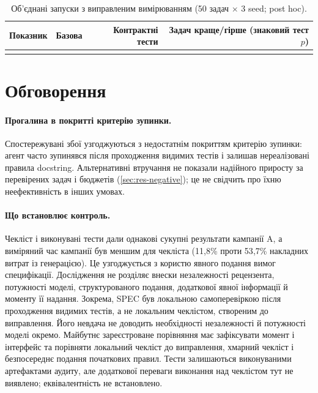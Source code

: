 \documentclass[11pt]{article}
\begin{document}
\begin{table}[tb]
\centering\small
\caption{Об'єднані запуски з виправленим вимірюванням (50 задач $\times$ 3 seed; post hoc).}\label{tab:pooled}
\begin{tabularx}{\linewidth}{@{}Lrrr@{}}
\toprule
Показник & Базова & Контрактні тести & Задач краще/гірше (знаковий тест $p$) \\
\midrule
{}
\bottomrule
\end{tabularx}
\end{table}

\section{Обговорення}\label{sec:discussion}
\paragraph{Прогалина в покритті критерію зупинки.} Спостережувані збої узгоджуються з недостатнім покриттям критерію зупинки: агент часто зупинявся після проходження видимих тестів і залишав нереалізовані правила docstring. Альтернативні втручання не показали надійного приросту за перевірених задач і бюджетів (\cref{sec:res-negative}); це не свідчить про їхню неефективність в інших умовах.

\paragraph{Що встановлює контроль.} Чекліст і виконувані тести дали однакові сукупні результати кампанії A, а виміряний час кампанії був меншим для чекліста (11{,}8\% проти 53{,}7\% накладних витрат із генерацією). Це узгоджується з користю явного подання вимог специфікації. Дослідження не розділяє внески незалежності рецензента, потужності моделі, структурованого подання, додаткової явної інформації й моменту її надання. Зокрема, SPEC був локальною самоперевіркою після проходження видимих тестів, а не локальним чеклістом, створеним до виправлення. Його невдача не доводить необхідності незалежності й потужності моделі окремо. Майбутнє зареєстроване порівняння має зафіксувати момент і інтерфейс та порівняти локальний чекліст до виправлення, хмарний чекліст і безпосереднє подання початкових правил. Тести залишаються виконуваними артефактами аудиту, але додаткової переваги виконання над чеклістом тут не виявлено; еквівалентність не встановлено.
\end{document}
